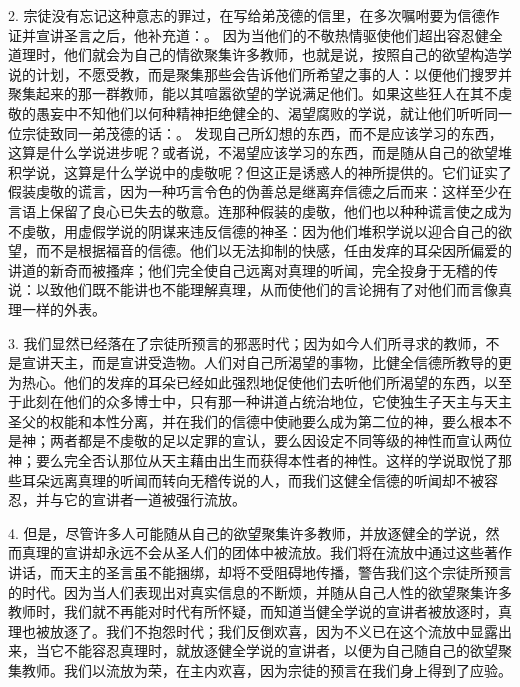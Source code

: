 2. 宗徒没有忘记这种意志的罪过，在写给弟茂德的信里，在多次嘱咐要为信德作证并宣讲圣言之后，他补充道：。 因为当他们的不敬热情驱使他们超出容忍健全道理时，他们就会为自己的情欲聚集许多教师，也就是说，按照自己的欲望构造学说的计划，不愿受教，而是聚集那些会告诉他们所希望之事的人：以便他们搜罗并聚集起来的那一群教师，能以其喧嚣欲望的学说满足他们。如果这些狂人在其不虔敬的愚妄中不知他们以何种精神拒绝健全的、渴望腐败的学说，就让他们听听同一位宗徒致同一弟茂德的话：。 发现自己所幻想的东西，而不是应该学习的东西，这算是什么学说进步呢？或者说，不渴望应该学习的东西，而是随从自己的欲望堆积学说，这算是什么学说中的虔敬呢？但这正是诱惑人的神所提供的。它们证实了假装虔敬的谎言，因为一种巧言令色的伪善总是继离弃信德之后而来：这样至少在言语上保留了良心已失去的敬意。连那种假装的虔敬，他们也以种种谎言使之成为不虔敬，用虚假学说的阴谋来违反信德的神圣：因为他们堆积学说以迎合自己的欲望，而不是根据福音的信德。他们以无法抑制的快感，任由发痒的耳朵因所偏爱的讲道的新奇而被搔痒；他们完全使自己远离对真理的听闻，完全投身于无稽的传说：以致他们既不能讲也不能理解真理，从而使他们的言论拥有了对他们而言像真理一样的外表。\par

3. 我们显然已经落在了宗徒所预言的邪恶时代；因为如今人们所寻求的教师，不是宣讲天主，而是宣讲受造物。人们对自己所渴望的事物，比健全信德所教导的更为热心。他们的发痒的耳朵已经如此强烈地促使他们去听他们所渴望的东西，以至于此刻在他们的众多博士中，只有那一种讲道占统治地位，它使独生子天主与天主圣父的权能和本性分离，并在我们的信德中使祂要么成为第二位的神，要么根本不是神；两者都是不虔敬的足以定罪的宣认，要么因设定不同等级的神性而宣认两位神；要么完全否认那位从天主藉由出生而获得本性者的神性。这样的学说取悦了那些耳朵远离真理的听闻而转向无稽传说的人，而我们这健全信德的听闻却不被容忍，并与它的宣讲者一道被强行流放。\par

4. 但是，尽管许多人可能随从自己的欲望聚集许多教师，并放逐健全的学说，然而真理的宣讲却永远不会从圣人们的团体中被流放。我们将在流放中通过这些著作讲话，而天主的圣言虽不能捆绑，却将不受阻碍地传播，警告我们这个宗徒所预言的时代。因为当人们表现出对真实信息的不断烦，并随从自己人性的欲望聚集许多教师时，我们就不再能对时代有所怀疑，而知道当健全学说的宣讲者被放逐时，真理也被放逐了。我们不抱怨时代；我们反倒欢喜，因为不义已在这个流放中显露出来，当它不能容忍真理时，就放逐健全学说的宣讲者，以便为自己随自己的欲望聚集教师。我们以流放为荣，在主内欢喜，因为宗徒的预言在我们身上得到了应验。\par

